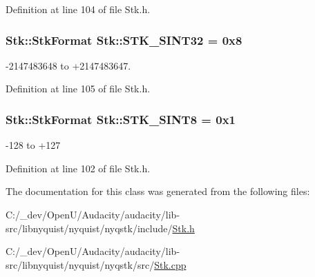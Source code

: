Definition at line 104 of file Stk.\+h.

\subsubsection[{\texorpdfstring{S\+T\+K\+\_\+\+S\+I\+N\+T32}{STK_SINT32}}]{ {\bf Stk\+::\+Stk\+Format} Stk\+::\+S\+T\+K\+\_\+\+S\+I\+N\+T32 = 0x8\hspace{0.3cm}{\ttfamily [static]}}\hypertarget{class_nyq_1_1_stk_acf8717472230415ff11bf499fc079bc5}{}\label{class_nyq_1_1_stk_acf8717472230415ff11bf499fc079bc5}
-\/2147483648 to +2147483647. 

Definition at line 105 of file Stk.\+h.

\subsubsection[{\texorpdfstring{S\+T\+K\+\_\+\+S\+I\+N\+T8}{STK_SINT8}}]{ {\bf Stk\+::\+Stk\+Format} Stk\+::\+S\+T\+K\+\_\+\+S\+I\+N\+T8 = 0x1\hspace{0.3cm}{\ttfamily [static]}}\hypertarget{class_nyq_1_1_stk_a5534403dfce86091451c6f23f48e39b3}{}\label{class_nyq_1_1_stk_a5534403dfce86091451c6f23f48e39b3}
-\/128 to +127 

Definition at line 102 of file Stk.\+h.



The documentation for this class was generated from the following files\+:\begin{DoxyCompactItemize}
\item 
C\+:/\+\_\+dev/\+Open\+U/\+Audacity/audacity/lib-\/src/libnyquist/nyquist/nyqstk/include/\hyperlink{_stk_8h}{Stk.\+h}\item 
C\+:/\+\_\+dev/\+Open\+U/\+Audacity/audacity/lib-\/src/libnyquist/nyquist/nyqstk/src/\hyperlink{_stk_8cpp}{Stk.\+cpp}\end{DoxyCompactItemize}

